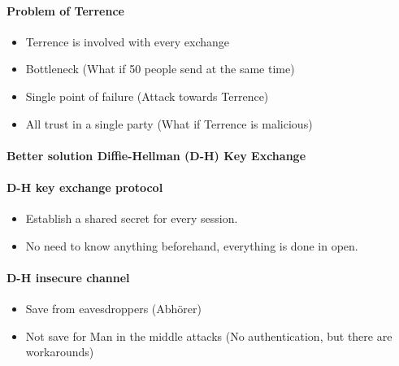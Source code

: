 \paragraph{Problem of Terrence}
\begin{itemize}
  \item Terrence is involved with every exchange
  \item Bottleneck (What if 50 people send at the same time)
  \item Single point of failure (Attack towards Terrence)
  \item All trust in a single party (What if Terrence  is malicious)
\end{itemize}
\pagebreak
\paragraph{Better solution \textbf{Diffie-Hellman (D-H) Key Exchange}}
\paragraph{D-H key exchange protocol}
\begin{itemize}
  \item Establish a shared secret for every session.
  \item No need to know anything beforehand, everything is done in open.
\end{itemize}
\paragraph{D-H insecure channel}
\begin{itemize}
  \item Save from eavesdroppers (Abhörer)
  \item Not save for Man in the middle attacks (No authentication, but there are workarounds)
\end{itemize}
